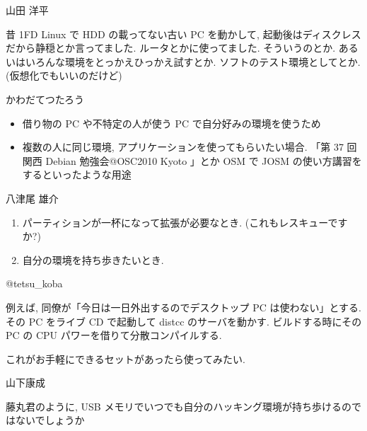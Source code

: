 \documentclass[mingoth,a4paper]{jsarticle}
\begin{document}
\begin{prework}{ 山田 洋平 }

昔 1FD Linux で HDD の載ってない古い PC を動かして, 起動後はディスクレスだから静穏とか言ってました. ルータとかに使ってました. そういうのとか.
あるいはいろんな環境をとっかえひっかえ試すとか. ソフトのテスト環境としてとか. (仮想化でもいいのだけど)

\end{prework}



\begin{prework}{ かわだてつたろう }

    \begin{itemize}
          \item 借り物の PC や不特定の人が使う PC で自分好みの環境を使うため
          \item 複数の人に同じ環境, アプリケーションを使ってもらいたい場合.
        「第 37 回関西 Debian 勉強会@OSC2010 Kyoto 」とか OSM で JOSM の使い方講習をするといったような用途
    \end{itemize}


\end{prework}



\begin{prework}{ 八津尾  雄介 }
    \begin{enumerate}
          \item パーティションが一杯になって拡張が必要なとき.
        (これもレスキューですか?)
          \item 自分の環境を持ち歩きたいとき.
    \end{enumerate}

\end{prework}



\begin{prework}{@tetsu\_koba }

例えば, 同僚が「今日は一日外出するのでデスクトップ PC は使わない」とする.
その PC をライブ CD で起動して distcc のサーバを動かす.
ビルドする時にその PC の CPU パワーを借りて分散コンパイルする.

これがお手軽にできるセットがあったら使ってみたい.

\end{prework}



\begin{prework}{ 山下康成 }

藤丸君のように, USB メモリでいつでも自分のハッキング環境が持ち歩けるのではないでしょうか

\end{prework}
\end{document}
